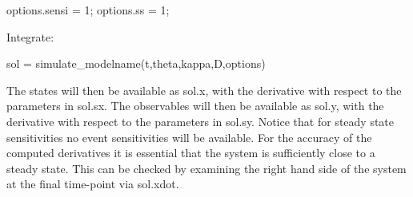 \begin{DoxyCode}
options.sensi = 1;
options.ss = 1;
\end{DoxyCode}


Integrate\+:


\begin{DoxyCode}
sol = simulate\_modelname(t,theta,kappa,D,options)
\end{DoxyCode}


The states will then be available as sol.\+x, with the derivative with respect to the parameters in sol.\+sx. The observables will then be available as sol.\+y, with the derivative with respect to the parameters in sol.\+sy. Notice that for steady state sensitivities no event sensitivities will be available. For the accuracy of the computed derivatives it is essential that the system is sufficiently close to a steady state. This can be checked by examining the right hand side of the system at the final time-\/point via sol.\+xdot. 